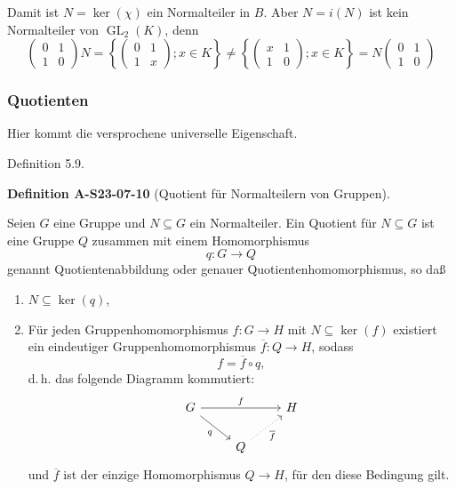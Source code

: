 \documentclass[10pt, letterpaper]{article}
\newcommand{\CustomHeading}[3]{%
  \par\medskip\noindent%
  \textbf{#1 #2} \textnormal{(#3)}.\enskip%
}
\newenvironment{DEF}[2]{\begin{unitbox}\CustomHeading{Definition}{#1}{#2}}{\end{unitbox}}
\begin{document}
Damit ist $N=\operatorname{ker}(\chi)$ ein Normalteiler in $B$. Aber $N=i(N)$ ist kein Normalteiler von $\operatorname{GL}_{2}(K)$, denn
$$
\left(\begin{array}{ll}
0 & 1 \\
1 & 0
\end{array}\right) N=\left\{\left(\begin{array}{ll}
0 & 1 \\
1 & x
\end{array}\right) ; x \in K\right\} \neq\left\{\left(\begin{array}{ll}
x & 1 \\
1 & 0
\end{array}\right) ; x \in K\right\}=N\left(\begin{array}{ll}
0 & 1 \\
1 & 0
\end{array}\right)
$$



\subsubsection{Quotienten} 

Hier kommt die versprochene universelle Eigenschaft.

Definition 5.9. 


\begin{DEF}{A-S23-07-10}{Quotient für Normalteilern von Gruppen}
Seien $G$ eine Gruppe und $N \subseteq G$ ein Normalteiler. Ein Quotient für $N \subseteq G$ ist eine Gruppe $Q$ zusammen mit einem Homomorphismus
$$
q: G \rightarrow Q
$$
genannt Quotientenabbildung oder genauer Quotientenhomomorphismus, so daß
\begin{enumerate}[label=(\roman*)]
  \item \( N \subseteq \operatorname{ker}(q) \),
  
  \item Für jeden Gruppenhomomorphismus \( f: G \rightarrow H \) mit \( N \subseteq \operatorname{ker}(f) \) existiert ein eindeutiger Gruppenhomomorphismus \( \overline{f}: Q \rightarrow H \), sodass
  \[
    f = \overline{f} \circ q,
  \]
  d.\,h. das folgende Diagramm kommutiert:
  \[
    \begin{tikzcd}
    G \arrow[rr, "f"] \arrow[dr, "q"'] &  & H \\
    & Q \arrow[ur, dotted, "\overline{f}"'] &
    \end{tikzcd}
  \]
  und \( \overline{f} \) ist der einzige Homomorphismus \( Q \rightarrow H \), für den diese Bedingung gilt.
\end{enumerate}
\end{DEF}
\end{document}
